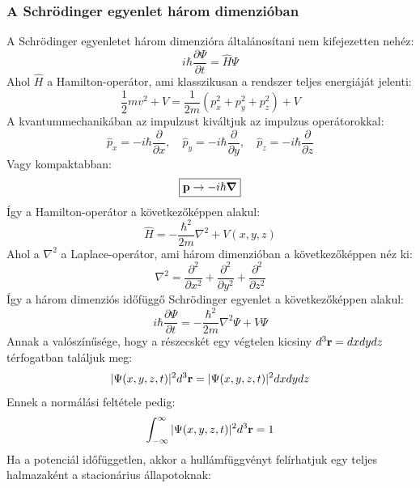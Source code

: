 \documentclass[../main.tex]{subfiles}
\begin{document}
\subsubsection{A Schrödinger egyenlet három dimenzióban}
A Schrödinger egyenletet három dimenzióra általánosítani nem kifejezetten nehéz:
\begin{equation}
    i \hbar \frac{\partial \Psi}{\partial t} = \hat{H} \Psi
\end{equation}
Ahol $\hat{H}$ a Hamilton-operátor, ami klasszikusan a rendszer teljes energiáját jelenti:
\begin{equation}
    \frac{1}{2} m v^2 + V = \frac{1}{2m} (p_x^2 + p_y^2 + p_z^2) + V
\end{equation}
A kvantummechanikában az impulzust kiváltjuk az impulzus operátorokkal:
\begin{equation}
    \hat{p}_x = -i \hbar \frac{\partial}{\partial x}, \quad \hat{p}_y = -i \hbar \frac{\partial}{\partial y}, \quad \hat{p}_z = -i \hbar \frac{\partial}{\partial z}
\end{equation}
Vagy kompaktabban:
\begin{equation}
    \boxed{\bold{p} \to -i \hbar \boldsymbol{\nabla}}
\end{equation}
Így a Hamilton-operátor a következőképpen alakul:
\begin{equation}
    \hat{H} = - \frac{\hbar^2}{2m} \nabla^2 + V(x,y,z)
\end{equation}
Ahol a $\nabla^2$ a Laplace-operátor, ami három dimenzióban a következőképpen néz ki:
\begin{equation}
    \nabla^2 = \frac{\partial^2}{\partial x^2} + \frac{\partial^2}{\partial y^2} + \frac{\partial^2}{\partial z^2}
\end{equation}
Így a három dimenziós időfüggő Schrödinger egyenlet a következőképpen alakul:
\begin{equation}
    \boxed{i \hbar \frac{\partial \Psi}{\partial t} = - \frac{\hbar^2}{2m} \nabla^2 \Psi + V \Psi}
\end{equation}
Annak a valószínűsége, hogy a részecskét egy végtelen kicsiny $d^3 \bold{r} = dx dy dz$ térfogatban találjuk meg:
\begin{equation}
    | \Psi(x,y,z,t) |^2 d^3 \bold{r} = |\Psi(x,y,z,t)|^2 dx dy dz
\end{equation}
Ennek a normálási feltétele pedig:
\begin{equation}
    \int_{-\infty}^{\infty} |\Psi(x,y,z,t)|^2 d^3 \bold{r} = 1
\end{equation}
Ha a potenciál időfüggetlen, akkor a hullámfüggvényt felírhatjuk egy teljes halmazaként a stacionárius állapotoknak:
\end{document}
